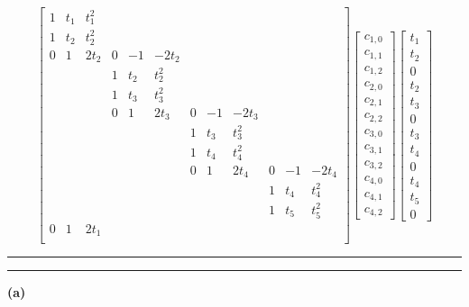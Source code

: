 \documentclass[11pt,letterpaper]{article}
\newcommand{\question}[1] {\vspace{.25in} \hrule\vspace{0.5em}
\noindent{\bf #1} \vspace{0.5em}
\hrule \vspace{.10in}}
\renewcommand{\part}[1] {\vspace{.10in} {\bf (#1)}}
\begin{document}
\[ \left[ \begin{array}{cccccccccccc}
1 & t_1 & t_1^2 \\
1 & t_2 & t_2^2 \\
0 &   1 &  2t_2 & 0 & -1 & -2t_2 \\
  &     &       & 1 & t_2 & t_2^2 \\
  &     &       & 1 & t_3 & t_3^2 \\
  &     &       & 0 &   1 &  2t_3 & 0 & -1 & -2t_3 \\
  &     &       &   &     &       & 1 & t_3 & t_3^2 \\
  &     &       &   &     &       & 1 & t_4 & t_4^2 \\
  &     &       &   &     &       & 0 &   1 &  2t_4 & 0 & -1 & -2t_4 \\
  &     &       &   &     &       &   &     &       & 1 & t_4 & t_4^2 \\
  &     &       &   &     &       &   &     &       & 1 & t_5 & t_5^2 \\
0 &   1 &  2t_1 &   &     &       \\
\end{array} \right]\left[ \begin{array}{c}
c_{1,0}\\
c_{1,1}\\
c_{1,2}\\
c_{2,0}\\
c_{2,1}\\
c_{2,2}\\
c_{3,0}\\
c_{3,1}\\
c_{3,2}\\
c_{4,0}\\
c_{4,1}\\
c_{4,2}
\end{array} \right]\left[ \begin{array}{c}
t_1\\
t_2\\
0\\
t_2\\
t_3\\
0\\
t_3\\
t_4\\
0\\
t_4\\
t_5\\
0
\end{array} \right]\]



\question{4}
\part{a}
\end{document}

